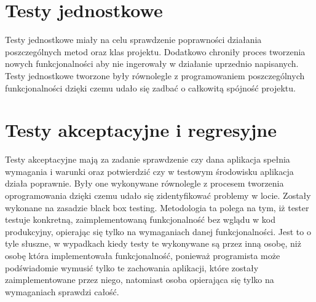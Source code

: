 \documentclass{BscUS}
\begin{document}
\section{Testy jednostkowe}
\indent Testy jednostkowe miały na celu sprawdzenie poprawności działania poszczególnych metod oraz klas projektu. Dodatkowo chroniły proces tworzenia nowych funkcjonalności aby nie ingerowały w działanie uprzednio napisanych. Testy jednostkowe tworzone były równolegle z programowaniem poszczególnych funkcjonalności dzięki czemu udało się zadbać o całkowitą spójność projektu.
\section{Testy akceptacyjne i regresyjne}
\indent Testy akceptacyjne mają za zadanie sprawdzenie czy dana aplikacja spełnia wymagania i warunki oraz potwierdzić czy w testowym środowisku aplikacja działa poprawnie. Były one wykonywane równolegle z procesem tworzenia oprogramowania dzięki czemu udało się zidentyfikować problemy w locie. Zostały wykonane na zasadzie black box testing. Metodologia ta polega na tym, iż tester testuje konkretną, zaimplementowaną funkcjonalność bez wglądu w kod produkcyjny, opierając się tylko na wymaganiach danej funkcjonalności. Jest to o tyle słuszne, w wypadkach kiedy testy te wykonywane są przez inną osobę, niż osobę która implementowała funkcjonalność, ponieważ programista może podświadomie wymusić tylko te zachowania aplikacji, które zostały zaimplementowane przez niego, natomiast osoba opierająca się tylko na wymaganiach sprawdzi całość.
\end{document}
